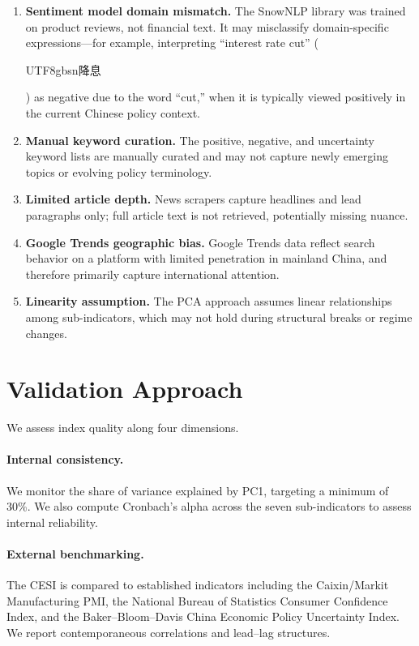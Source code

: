 \documentclass[11pt]{article}
\begin{document}
\begin{enumerate}[nosep]
  \item \textbf{Sentiment model domain mismatch.}  The SnowNLP
    library was trained on product reviews, not financial text.  It
    may misclassify domain-specific expressions---for example,
    interpreting ``interest rate cut''
    (\begin{CJK}{UTF8}{gbsn}降息\end{CJK}) as negative due to the
    word ``cut,'' when it is typically viewed positively in the
    current Chinese policy context.
  \item \textbf{Manual keyword curation.}  The positive, negative,
    and uncertainty keyword lists are manually curated and may not
    capture newly emerging topics or evolving policy terminology.
  \item \textbf{Limited article depth.}  News scrapers capture
    headlines and lead paragraphs only; full article text is not
    retrieved, potentially missing nuance.
  \item \textbf{Google Trends geographic bias.}  Google Trends data
    reflect search behavior on a platform with limited penetration
    in mainland China, and therefore primarily capture
    international attention.
  \item \textbf{Linearity assumption.}  The PCA approach assumes
    linear relationships among sub-indicators, which may not hold
    during structural breaks or regime changes.
\end{enumerate}

\section{Validation Approach}\label{sec:validation}

We assess index quality along four dimensions.

\paragraph{Internal consistency.}  We monitor the share of variance
explained by PC1, targeting a minimum of 30\%.  We also compute
Cronbach's alpha across the seven sub-indicators to assess internal
reliability.

\paragraph{External benchmarking.}  The CESI is compared to
established indicators including the Caixin/Markit Manufacturing PMI,
the National Bureau of Statistics Consumer Confidence Index, and the
Baker--Bloom--Davis China Economic Policy Uncertainty Index.  We
report contemporaneous correlations and lead--lag structures.
\end{document}
